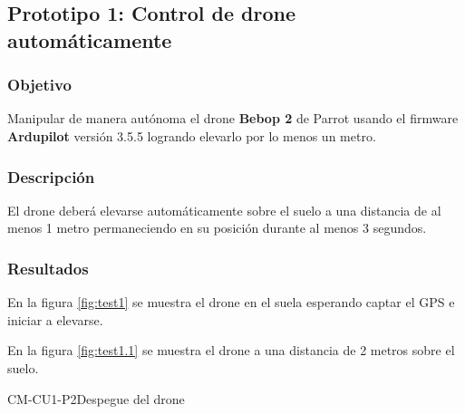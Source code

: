 \subsection{Prototipo 1: Control de drone automáticamente}

\subsubsection{Objetivo}
Manipular de manera autónoma el drone \textbf{Bebop 2} de Parrot usando el firmware \textbf{Ardupilot} versión 3.5.5 logrando elevarlo por lo menos un metro.

\subsubsection{Descripción}
El drone deberá elevarse automáticamente sobre el suelo a una distancia de al menos 1 metro permaneciendo en su posición durante al menos 3 segundos.

\subsubsection{Resultados}
En la figura \ref{fig:test1} se muestra el drone en el suela esperando captar el GPS e iniciar a elevarse.

En la figura \ref{fig:test1.1} se muestra el drone a una distancia de 2 metros sobre el suelo.



\begin{prueba}{CM-CU1-P2}{Despegue del drone}
\end{prueba}
